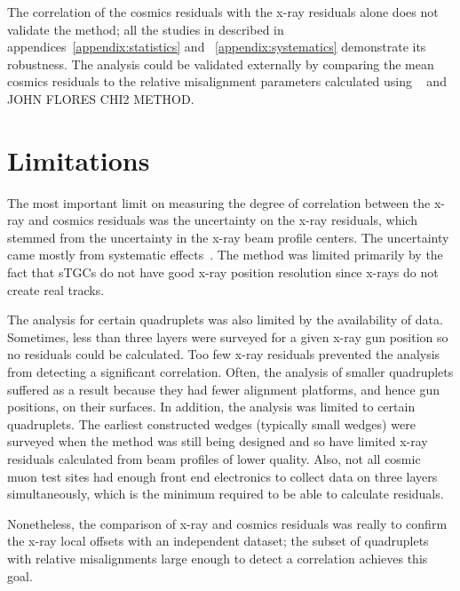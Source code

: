 The correlation of the cosmics residuals with the x-ray residuals alone does not validate the method; all the studies in described in appendices~\ref{appendix:statistics} and ~\ref{appendix:systematics} demonstrate its robustness. The analysis could be validated externally by comparing the mean cosmics residuals to the relative misalignment parameters calculated using ~\cite{lefebvre_tgc_analysis} and JOHN FLORES CHI2 METHOD.

\section{Limitations}
The most important limit on measuring the degree of correlation between the x-ray and cosmics residuals was the uncertainty on the x-ray residuals, which stemmed from the uncertainty in the x-ray beam profile centers. The uncertainty came mostly from systematic effects~\cite{lefebvre_precision_2020}. The method was limited primarily by the fact that sTGCs do not have good x-ray position resolution since x-rays do not create real tracks. 

The analysis for certain quadruplets was also limited by the availability of data. Sometimes, less than three layers were surveyed for a given x-ray gun position so no residuals could be calculated. Too few x-ray residuals prevented the analysis from detecting a significant correlation. Often, the analysis of smaller quadruplets suffered as a result because they had fewer alignment platforms, and hence gun positions, on their surfaces. In addition, the analysis was limited to certain quadruplets. The earliest constructed wedges (typically small wedges) were surveyed when the method was still being designed and so have limited x-ray residuals calculated from beam profiles of lower quality. Also, not all cosmic muon test sites had enough front end electronics to collect data on three layers simultaneously, which is the minimum required to be able to calculate residuals.

Nonetheless, the comparison of x-ray and cosmics residuals was really to confirm the x-ray local offsets with an independent dataset; the subset of quadruplets with relative misalignments large enough to detect a correlation achieves this goal.
